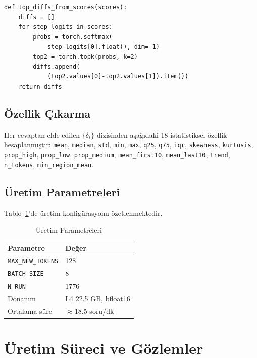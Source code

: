 \documentclass[conference]{IEEEtran}
\begin{document}
\begin{lstlisting}
def top_diffs_from_scores(scores):
    diffs = []
    for step_logits in scores:
        probs = torch.softmax(
            step_logits[0].float(), dim=-1)
        top2 = torch.topk(probs, k=2)
        diffs.append(
            (top2.values[0]-top2.values[1]).item())
    return diffs
\end{lstlisting}

\subsection{Özellik Çıkarma}

Her cevaptan elde edilen $\{\delta_t\}$ dizisinden aşağıdaki 18 istatistiksel
özellik hesaplanmıştır: \texttt{mean}, \texttt{median}, \texttt{std},
\texttt{min}, \texttt{max}, \texttt{q25}, \texttt{q75}, \texttt{iqr},
\texttt{skewness}, \texttt{kurtosis}, \texttt{prop\_high}, \texttt{prop\_low},
\texttt{prop\_medium}, \texttt{mean\_first10}, \texttt{mean\_last10},
\texttt{trend}, \texttt{n\_tokens}, \texttt{min\_region\_mean}.

\subsection{Üretim Parametreleri}

Tablo~\ref{tab:params}'de üretim konfigürasyonu özetlenmektedir.

\begin{table}[H]
  \centering
  \caption{Üretim Parametreleri}
  \label{tab:params}
  \begin{tabular}{ll}
    \toprule
    \textbf{Parametre}       & \textbf{Değer} \\
    \midrule
    \texttt{MAX\_NEW\_TOKENS} & 128 \\
    \texttt{BATCH\_SIZE}      & 8 \\
    \texttt{N\_RUN}           & 1776 \\
    Donanım                  & L4 22.5 GB, bfloat16 \\
    Ortalama süre            & $\approx$18.5 soru/dk \\
    \bottomrule
  \end{tabular}
\end{table}

\section{Üretim Süreci ve Gözlemler}
\end{document}
